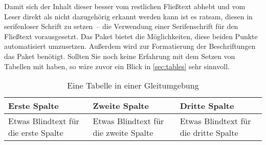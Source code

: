 \documentclass[%
  english,ngerman,%
  cdgeometry=no,DIV=12,automark,%
]{tudscrartcl}
\begin{document}
Damit sich der Inhalt dieser besser vom restlichen Fließtext abhebt und vom 
Leser direkt als nicht dazugehörig erkannt werden kann ist es ratsam, diesen in 
serifenloser Schrift zu setzen~-- die Verwendung einer Serifenschrift für den 
Fließtext vorausgesetzt. Das Paket  bietet die Möglichkeiten, 
diese beiden Punkte automatisiert umzusetzen. Außerdem wird zur Formatierung 
der Beschriftungen das Paket  benötigt. Sollten Sie noch keine 
Erfahrung mit dem Setzen von Tabellen mit  haben, so wäre zuvor 
ein Blick in \autoref{sec:tables} sehr sinnvoll. 

\newcommand*\tableexample[1][]{%
  \begin{tabularx}{.75\textwidth}{@{}XXX@{}}
  \toprule
  \textbf{Erste Spalte} & \textbf{Zweite Spalte} & 
  \textbf{Dritte Spalte} \tabularnewline
  \midrule
  Etwas Blindtext für die erste Spalte &
  Etwas Blindtext für die zweite Spalte &
  Etwas Blindtext für die dritte Spalte
  \tabularnewline
  \bottomrule
  \end{tabularx}
  #1%
}
\begin{table}
\tableexample[%
  \caption{Eine Tabelle in einer Gleitumgebung}\label{tab:tabular}%
]
\end{table}
\end{document}
